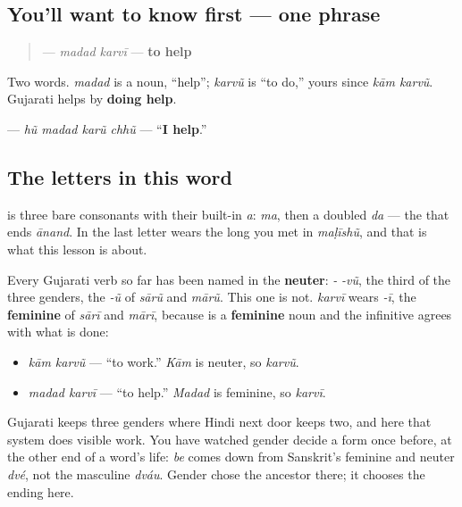 \subsection*{You'll want to know first — one phrase}
\begin{quote}
\textbf{ } — \emph{madad karvī} — \textbf{to help}
\end{quote}

Two words. \textbf{} \emph{madad} is a noun, \textquotedblleft{}help\textquotedblright{}; \textbf{} \emph{karvũ} is \textquotedblleft{}to do,\textquotedblright{} yours since \emph{kām karvũ}. Gujarati helps by \textbf{doing help}.

\textbf{   } — \emph{hũ madad karũ chhũ} — \textquotedblleft{}\textbf{I help}.\textquotedblright{}

\subsection*{The letters in this word}
\textbf{} is three bare consonants with their built-in \emph{a}: \textbf{} \emph{ma}, then a doubled \textbf{} \emph{da} — the \textbf{} that ends \emph{ānand}. In \textbf{} the last letter wears the long \textbf{} you met in \emph{maḷīshũ}, and that \textbf{} is what this lesson is about.

\begin{grammarlens}[title={Grammar Lens: the ending that stopped being neuter}]
Every Gujarati verb so far has been named in the \textbf{neuter}: \emph{-} \emph{-vũ}, the third of the three genders, the \emph{-ũ} of \emph{sārũ} and \emph{mārũ}. This one is not. \textbf{} \emph{karvī} wears \emph{-ī}, the \textbf{feminine} of \emph{sārī} and \emph{mārī}, because \textbf{} is a \textbf{feminine} noun and the infinitive agrees with what is done:

\begin{itemize}
\raggedright
  \item \textbf{ } \emph{kām karvũ} — \textquotedblleft{}to work.\textquotedblright{} \emph{Kām} is neuter, so \emph{karvũ}.
  \item \textbf{ } \emph{madad karvī} — \textquotedblleft{}to help.\textquotedblright{} \emph{Madad} is feminine, so \emph{karvī}.
\end{itemize}

Gujarati keeps three genders where Hindi next door keeps two, and here that system does visible work. You have watched gender decide a form once before, at the other end of a word's life: \textbf{} \emph{be} comes down from Sanskrit's feminine and neuter \emph{dvé}, not the masculine \emph{dváu}. Gender chose the ancestor there; it chooses the ending here.
\end{grammarlens}

